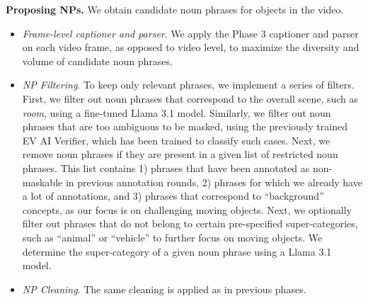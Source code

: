 \documentclass[]{fairmeta}
\renewcommand{\paragraph}[1]{%
	\noindent\textbf{#1.}\noindent\xspace%
}
\begin{document}
\paragraph{Proposing NPs} We obtain candidate noun phrases for objects in the video. 
\begin{itemize}
	\item \textit{Frame-level captioner and parser}. We apply the Phase 3 captioner and parser on each video frame, as opposed to video level, to maximize the diversity and volume of candidate noun phrases.
	\item \textit{NP Filtering}. To keep only relevant phrases, we implement a series of filters. First, we filter out noun phrases that correspond to the overall scene, such as \textit{room}, using a fine-tuned Llama 3.1 model. Similarly, we filter out noun phrases that are too ambiguous to be masked, using the previously trained EV AI Verifier, which has been trained to classify such cases. Next, we remove noun phrases if they are present in a given list of restricted noun phrases. This list contains 1)  phrases that have been annotated as non-maskable in previous annotation rounds, 2)  phrases for which we already have a lot of annotations, and 3)  phrases that correspond to ``background'' concepts, as our focus is on challenging moving objects. Next, we optionally filter out  phrases that do not belong to certain pre-specified super-categories, such as ``animal'' or ``vehicle'' to further focus on moving objects. We determine the super-category of a given noun phrase using a Llama 3.1 model.
	\item \textit{NP Cleaning}. The same cleaning is applied as in previous phases.
\end{itemize}
\end{document}
